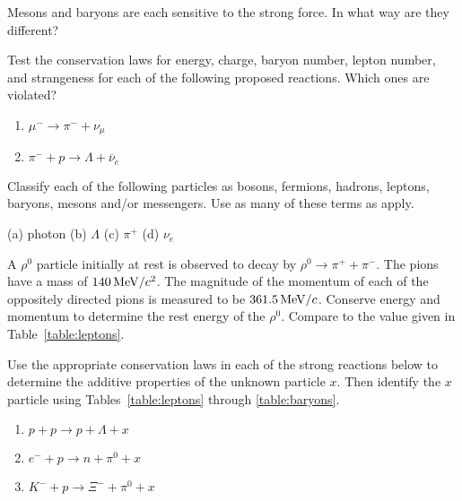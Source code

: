 \begin{problem}
Mesons and baryons are each sensitive to the strong force.  In
  what way are they different?
\label{prob:mesons_vs_baryons}
\end{problem}

\begin{problem}
Test the conservation laws for energy, charge, baryon number,
  lepton number, and strange\-ness %
for each
  of the following proposed reactions.  Which ones are violated?
  \begin{enumerate}
  \item $\mu^- \to \pi^- + \nu_\mu$
  \item $\pi^- + p \to \Lambda + \overline\nu_e$
  \end{enumerate}
\label{prob:conservation_laws_i}
\end{problem}


\begin{problem}
Classify each of the following particles as bosons, fermions,
  hadrons, leptons, baryons, mesons and/or messengers.  Use as many of
  these terms as apply.\par\medskip
  (a) photon \qquad \qquad
  (b) $\Lambda$ \qquad \qquad
  (c) $\pi^+$ \qquad \qquad
  (d) $\nu_e$
\label{prob:classify_particles}
\end{problem}

\begin{problem}
A $\rho^0$ particle initially at rest is observed to decay by
  $\rho^0 \to \pi^+ + \pi^-$.  The pions have a mass of 
  $140\,\mbox{MeV/$c^2$}$.  The magnitude of the momentum of each 
  of the oppositely directed pions is measured to be 
  $361.5\,\mbox{MeV/$c$}$.  Conserve energy
  and momentum to determine the rest energy of the $\rho^0$.  Compare
  to the value given in Table~\ref{table:leptons}.
\label{prob:rho0_rest_energy}
\end{problem}

\begin{problem}
Use the appropriate conservation laws in each of the strong
  reactions below to determine the additive properties of the unknown
  particle $x$.  Then identify the $x$ particle using
  Tables~\ref{table:leptons} through \ref{table:baryons}.
  \begin{enumerate}
  \item $p + p \to p + \Lambda + x$
  \item $e^- + p \to n + \pi^0 + x$
  \item $K^- + p \to \Xi^- + \pi^0 + x$
  \end{enumerate}
\label{prob:identify_particle_x}
\end{problem}

